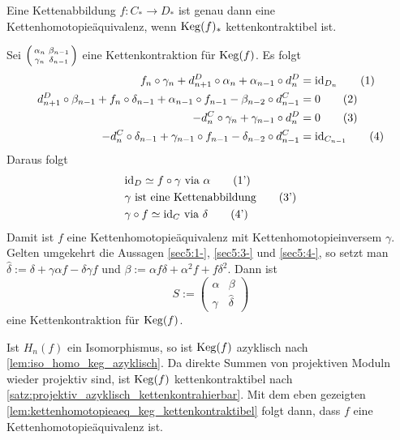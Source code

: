 \begin{lemma}[{name=[{Kettenhomotopieäquivalenz genau dann, wenn der Kegel kettenkontraktibel ist}]},label=lem:kettenhomotopieaeq_keg_kettenkontraktibel]
	Eine Kettenabbildung $f\colon C_* \to D_*$ ist genau dann eine Kettenhomotopieäquivalenz, wenn $\operatorname{Keg}(f)_*$ kettenkontraktibel ist.
\end{lemma}
\begin{beweis}
	Sei $\begin{psmallmatrix} \alpha_n & \beta_{n-1} \\ \gamma_n & \delta_{n-1} \end{psmallmatrix}$ eine Kettenkontraktion für $\operatorname{Keg}(f)$. Es folgt 
	\begin{align}
		f_n \circ \gamma_n + d^D_{n+1} \circ \alpha_n + \alpha_{n-1} \circ d_n^D &= {\operatorname{id}_{D_n}} \tag*{(1)} \\
		d^D_{n+1} \circ \beta_{n-1} + f_n \circ \delta_{n-1} + \alpha_{n-1} \circ f_{n-1} - \beta_{n-2} \circ d_{n-1}^C &= 0 \tag*{(2)}\\
		- d^C_n \circ \gamma_n + \gamma_{n-1} \circ d_n^D &= 0 \tag*{(3)} \\
		- d_n^C \circ \delta_{n-1} + \gamma_{n-1} \circ f_{n-1} - \delta_{n-2} \circ d^C_{n-1} &= {\operatorname{id}_{C_{n-1}}} \tag*{(4)}
	\end{align}
	Daraus folgt
	\begin{align}
		& {\operatorname{id}_D} \simeq f \circ \gamma \text{ via } \alpha \tag*{(1')} \label{sec5:1-} \\
		& \gamma \text{ ist eine Kettenabbildung} \tag*{(3')} \label{sec5:3-}\\
		& \gamma \circ f \simeq {\operatorname{id}_C} \text{ via }  \delta \tag*{(4')} \label{sec5:4-}
	\end{align}
	Damit ist $f$ eine Kettenhomotopieäquivalenz mit Kettenhomotopieinversem $\gamma$. 
	Gelten umgekehrt die Aussagen \ref{sec5:1-}, \ref{sec5:3-} und \ref{sec5:4-}, so setzt man $\hat{\delta} := \delta + \gamma \alpha f - \delta \gamma f$ und 
	$\beta := \alpha f \delta + \alpha^2 f + f \delta^2$. Dann ist 
	\[
		S := \begin{pmatrix}
			\alpha & \beta \\
			\gamma & \hat{\delta}
		\end{pmatrix}
	\]
	eine Kettenkontraktion für $\operatorname{Keg}(f)$.
\end{beweis}

\begin{beweis}[name={von \autoref{satz:5:kettenhomotopie} zweite Implikation},label=bew:satz5]
	Ist $H_n(f)$ ein Isomorphismus, so ist $\operatorname{Keg}(f)$ azyklisch nach \autoref{lem:iso_homo_keg_azyklisch}. 
	Da direkte Summen von projektiven Moduln wieder projektiv sind, ist $\operatorname{Keg}(f)$ kettenkontraktibel nach \autoref{satz:projektiv_azyklisch_kettenkontrahierbar}.
	Mit dem eben gezeigten \autoref{lem:kettenhomotopieaeq_keg_kettenkontraktibel} folgt dann, dass $f$ eine Kettenhomotopieäquivalenz ist.
\end{beweis}

